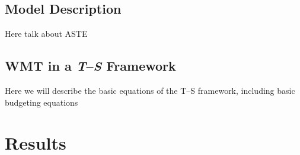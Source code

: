 \documentclass[draft]{agujournal2019}
\begin{document}
\subsection{Model Description}

Here talk about ASTE

\subsection{WMT in a \emph{T}--\emph{S} Framework}

Here we will describe the basic equations of the T--S framework, including basic budgeting equations






\section{Results}







%
%
\end{document}
